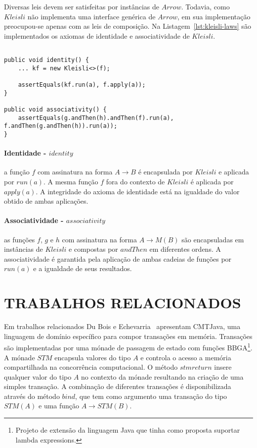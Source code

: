 \documentclass[10pt, conference]{IEEEtran}
\begin{document}
Diversas leis devem ser satisfeitas por instâncias de $Arrow$. Todavia, como $Kleisli$ não implementa uma interface genérica de $Arrow$, em sua implementação preocupou-se apenas com as leis de composição. Na Listagem~\ref{lst:kleisli-laws} são implementados os axiomas de identidade e associatividade de $Kleisli$.

\begin{lstlisting}[caption = {Leis de $Kleisli$}, label = {lst:kleisli-laws}]

public void identity() {
	... kf = new Kleisli<>(f);
	
	assertEquals(kf.run(a), f.apply(a));
}

public void associativity() {
	assertEquals(g.andThen(h).andThen(f).run(a), 							 f.andThen(g.andThen(h)).run(a));
}
\end{lstlisting}

\paragraph{Identidade - $identity$} a função $f$ com assinatura na forma $A \rightarrow B$ é encapsulada por $Kleisli$ e aplicada por $run(a)$. A mesma função $f$ fora do contexto de $Kleisli$ é aplicada por $apply(a)$. A integridade do axioma de identidade está na igualdade do valor obtido de ambas aplicações.

\paragraph{Associatividade - $associativity$} as funções $f$, $g$ e $h$ com assinatura na forma $A \rightarrow M(B)$ são encapsuladas em instâncias de $Kleisli$ e compostas por $andThen$ em diferentes ordens. A associatividade é garantida pela aplicação de ambas cadeias de funções por $run(a)$ e a igualdade de seus resultados.

\section{TRABALHOS RELACIONADOS}

Em trabalhos relacionados Du Bois e Echevarria~\cite{dubois2009domainspecific} apresentam CMTJava, uma linguagem de domínio específico para compor transações em memória. Transações são implementadas por uma mónade de passagem de estado com funções BBGA\footnote{Projeto de extensão da linguagem Java que tinha como proposta suportar lambda expressions.}. A mónade $STM$ encapsula valores do tipo $A$ e controla o acesso a memória compartilhada na concorrência computacional. O método $stmreturn$ insere qualquer valor do tipo $A$ no contexto da mónade resultando na criação de uma simples transação. A combinação de diferentes transações é disponibilizada através do método $bind$, que tem como argumento uma transação do tipo $STM(A)$ e uma função $A \rightarrow STM(B)$.
\end{document}
